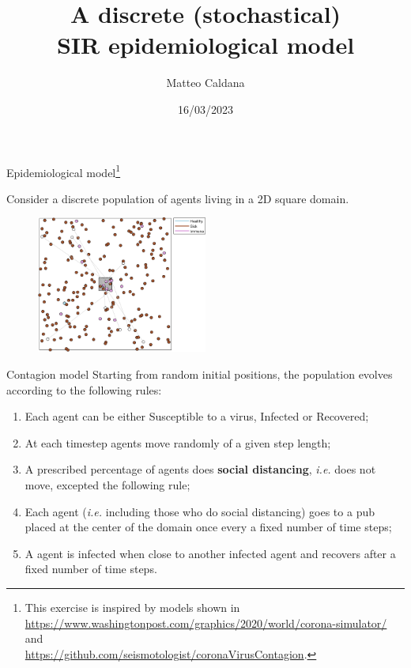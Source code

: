 \documentclass[10pt,aspectratio=169]{beamer}
\begin{document}
    \title{A discrete (stochastical)\protect\\SIR epidemiological model}
    \author{Matteo Caldana}
    \date{16/03/2023}
    
\begin{frame}
    \maketitle
\end{frame}

\begin{frame}{Epidemiological model\footnote{This exercise is inspired by models shown in \\
\url{https://www.washingtonpost.com/graphics/2020/world/corona-simulator/} and \\
\url{https://github.com/seismotologist/coronaVirusContagion}.}}

Consider a discrete population of agents living in a 2D square domain.

\begin{figure}
    \includegraphics[width=0.5\textwidth]{contagion.png}
\end{figure}
\end{frame}

\begin{frame}{Contagion model}
Starting from random initial positions, the population evolves according to the following rules:

\begin{enumerate}
    \item Each agent can be either Susceptible to a virus, Infected or Recovered;
    \item At each timestep agents move randomly of a given step length;
    \item A prescribed percentage of agents does \textbf{social distancing}, \textit{i.e.} does not move, excepted the following rule;
    \item Each agent (\textit{i.e.} including those who do social distancing) goes to a pub placed at the center of the domain once every a fixed number of time steps;
    \item A agent is infected when close to another infected agent and recovers after a fixed number of time steps.
\end{enumerate}
\end{frame}
\end{document}
